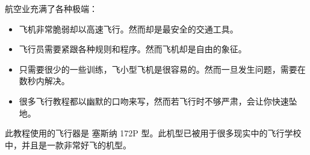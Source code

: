 \ifchinese
航空业充满了各种极端：
\begin{itemize}
\item 飞机非常脆弱却以高速飞行。然而却是最安全的交通工具。
\item 飞行员需要紧跟各种规则和程序。然而飞机却是自由的象征。
\item 只需要很少的一些训练，飞小型飞机是很容易的。然而一旦发生问题，需要在数秒内解决。
\item 很多飞行教程都以幽默的口吻来写，然而若飞行时不够严肃，会让你快速坠地。
\end{itemize}
\fi

\ifchinese
此教程使用的飞行器是 {塞斯纳 172P} 型。此机型已被用于很多现实中的飞行学校中，并且是一款非常好飞的机型。
\fi

